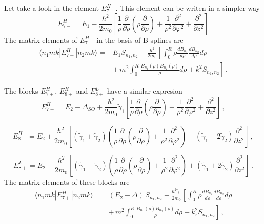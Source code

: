 \documentclass[12pt,a4paper]{article}
\begin{document}
Let take a look in the element $E_{7-}^H$. This element can be writen in a simpler way
\begin{equation}
E_{7-}^H = E_1 - \frac{\hbar^2}{2 m_0} \left[\frac{1}{\rho} \frac{\partial}{\partial \rho}\left(\rho \frac{\partial}{\partial \rho}  \right)
 + \frac{1}{\rho^2} \frac{\partial^2}{\partial \varphi^2} + \frac{\partial^2}{\partial z^2} \right]
\end{equation}
\noindent
The matrix elements of $E_{7-}^H$ in the basis of B-splines are
\begin{equation}
\begin{split}
  \langle n_1 m k|E_{7-}^H|n_2 m k\rangle =& E_1 S_{n_1, n_2} + \frac{\hbar^2}{2 m_0}
  \left[\int_0^{R} \rho \frac{d B_{n_1}}{d\rho} \frac{d B_{n_2}}{d\rho} d\rho\right. \\
  &\left.+\, m^2 \int_0^{R} \frac{B_{n_1}(\rho)B_{n_2}(\rho)}{\rho} d\rho + k^2 S_{n_1,n_2} \right]\,.
\end{split}
\end{equation}

The blocks $E_{7+}^H$, $E_{8+}^H$ and $E_{8+}^L$ have a similar expresion
\begin{equation}
  E_{7+}^H = E_2 - \Delta_{SO} + \frac{\hbar^2}{2 m_0}\tilde{\gamma}_1 \left[\frac{1}{\rho} \frac{\partial}{\partial \rho}\left(\rho \frac{\partial}{\partial \rho}  \right)
   + \frac{1}{\rho^2} \frac{\partial^2}{\partial \varphi^2} + \frac{\partial^2}{\partial z^2} \right]\,,
\end{equation}

\begin{equation}
  E_{8+}^H = E_2 + \frac{\hbar^2}{2 m_0} \left[\left(\tilde{\gamma}_1 + \tilde{\gamma}_2\right)
  \left(\frac{1}{\rho} \frac{\partial}{\partial \rho}\left(\rho \frac{\partial}{\partial \rho}  \right)
   + \frac{1}{\rho^2} \frac{\partial^2}{\partial \varphi^2}\right)
   + \left(\tilde{\gamma}_1-2\tilde{\gamma}_2\right)\frac{\partial^2}{\partial z^2} \right] \,,
\end{equation}

\begin{equation}
  E_{8+}^L = E_2 + \frac{\hbar^2}{2 m_0} \left[\left(\tilde{\gamma}_1 - \tilde{\gamma}_2\right)
  \left(\frac{1}{\rho} \frac{\partial}{\partial \rho}\left(\rho \frac{\partial}{\partial \rho}  \right)
   + \frac{1}{\rho^2} \frac{\partial^2}{\partial \varphi^2}\right)
   + \left(\tilde{\gamma}_1+2\tilde{\gamma}_2\right)\frac{\partial^2}{\partial z^2} \right]\,.
\end{equation}
\noindent
The matrix elements of these blocks are
\begin{equation}
\begin{split}
  \langle n_1 m k|E_{7+}^H|n_2 m k\rangle =& (E_2 - \Delta)\,S_{n_1, n_2} - \frac{\hbar^2\tilde{\gamma}_1}{2 m_0}
  \left[\int_0^{R} \rho \frac{d B_{n_1}}{d\rho} \frac{d B_{n_2}}{d\rho} d\rho\right. \\
  &\left.+\, m^2 \int_0^{R} \frac{B_{n_1}(\rho)B_{n_2}(\rho)}{\rho} d\rho + k_z^2 S_{n_1,n_2} \right]\,,
\end{split}
\end{equation}
\end{document}
